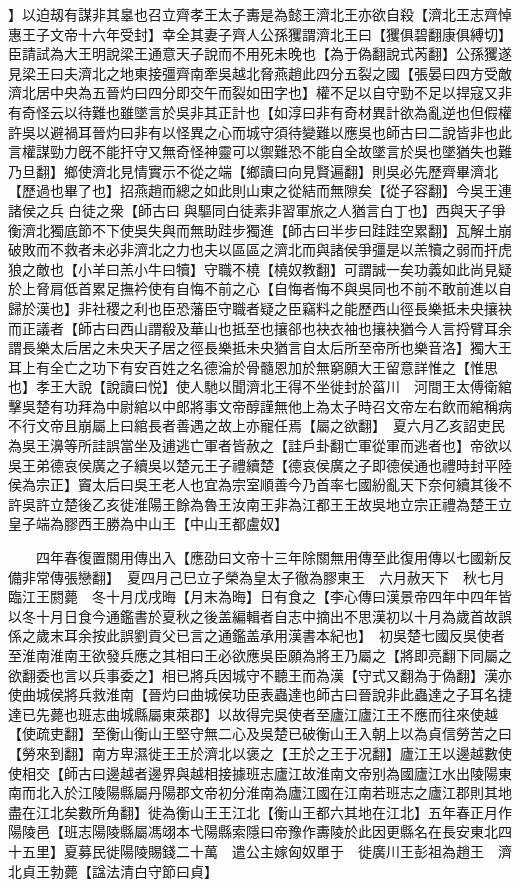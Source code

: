 】以迫刼有謀非其辠也召立齊孝王太子夀是為懿王濟北王亦欲自殺【濟北王志齊悼惠王子文帝十六年受封】幸全其妻子齊人公孫玃謂濟北王曰【玃俱碧翻康俱縛切】臣請試為大王明說梁王通意天子說而不用死未晚也【為于偽翻說式芮翻】公孫玃遂見梁王曰夫濟北之地東接彊齊南牽吳越北脅燕趙此四分五裂之國【張晏曰四方受敵濟北居中央為五晉灼曰四分即交午而裂如田字也】權不足以自守勁不足以捍寇又非有奇怪云以待難也雖墜言於吳非其正計也【如淳曰非有奇材異計欲為亂逆也但假權許吳以避禍耳晉灼曰非有以怪異之心而城守須待變難以應吳也師古曰二說皆非也此言權謀勁力旣不能扞守又無奇怪神靈可以禦難恐不能自全故墜言於吳也墜猶失也難乃旦翻】鄉使濟北見情實示不從之端【鄉讀曰向見賢遍翻】則吳必先歷齊畢濟北【歷過也畢了也】招燕趙而總之如此則山東之從結而無隙矣【從子容翻】今吳王連諸侯之兵白徒之衆【師古曰與驅同白徒素非習軍旅之人猶言白丁也】西與天子爭衡濟北獨底節不下使吳失與而無助跬步獨進【師古曰半步曰跬跬空累翻】瓦解土崩破敗而不救者未必非濟北之力也夫以區區之濟北而與諸侯爭彊是以羔犢之弱而扞虎狼之敵也【小羊曰羔小牛曰犢】守職不橈【橈奴教翻】可謂誠一矣功義如此尚見疑於上脅肩低首累足撫衿使有自悔不前之心【自悔者悔不與吳同也不前不敢前進以自歸於漢也】非社稷之利也臣恐藩臣守職者疑之臣竊料之能歷西山徑長樂抵未央攘袂而正議者【師古曰西山謂殽及華山也抵至也攘郤也袂衣袖也攘袂猶今人言捋臂耳余謂長樂太后居之未央天子居之徑長樂抵未央猶言自太后所至帝所也樂音洛】獨大王耳上有全亡之功下有安百姓之名德淪於骨髓恩加於無窮願大王留意詳惟之【惟思也】孝王大說【說讀曰悦】使人馳以聞濟北王得不坐徙封於菑川　河間王太傅衛綰擊吳楚有功拜為中尉綰以中郎將事文帝醇謹無他上為太子時召文帝左右飲而綰稱病不行文帝且崩屬上曰綰長者善遇之故上亦寵任焉【屬之欲翻】　夏六月乙亥詔吏民為吳王濞等所詿誤當坐及逋逃亡軍者皆赦之【詿戶卦翻亡軍從軍而逃者也】帝欲以吳王弟德哀侯廣之子續吳以楚元王子禮續楚【德哀侯廣之子即德侯通也禮時封平陸侯為宗正】竇太后曰吳王老人也宜為宗室順善今乃首率七國紛亂天下奈何續其後不許吳許立楚後乙亥徙淮陽王餘為魯王汝南王非為江都王王故吳地立宗正禮為楚王立皇子端為膠西王勝為中山王【中山王都盧奴】

　　四年春復置關用傳出入【應劭曰文帝十三年除關無用傳至此復用傳以七國新反備非常傳張戀翻】　夏四月己巳立子榮為皇太子徹為膠東王　六月赦天下　秋七月臨江王閼薨　冬十月戊戌晦【月末為晦】日有食之【李心傳曰漢景帝四年中四年皆以冬十月日食今通鑑書於夏秋之後盖編輯者自志中摘出不思漢初以十月為歲首故誤係之歲末耳余按此誤劉貢父已言之通鑑盖承用漢書本紀也】　初吳楚七國反吳使者至淮南淮南王欲發兵應之其相曰王必欲應吳臣願為將王乃屬之【將即亮翻下同屬之欲翻委也言以兵事委之】相已將兵因城守不聽王而為漢【守式又翻為于偽翻】漢亦使曲城侯將兵救淮南【晉灼曰曲城侯功臣表蟲達也師古曰晉說非此蟲達之子耳名捷達已先薨也班志曲城縣屬東萊郡】以故得完吳使者至廬江廬江王不應而往來使越【使疏吏翻】至衡山衡山王堅守無二心及吳楚已破衡山王入朝上以為貞信勞苦之曰【勞來到翻】南方卑濕徙王王於濟北以褒之【王於之王于况翻】廬江王以邊越數使使相交【師古曰邊越者邊界與越相接據班志廬江故淮南文帝别為國廬江水出陵陽東南而北入於江陵陽縣屬丹陽郡文帝初分淮南為廬江國在江南若班志之廬江郡則其地盡在江北矣數所角翻】徙為衡山王王江北【衡山王都六其地在江北】五年春正月作陽陵邑【班志陽陵縣屬馮翊本弋陽縣索隱曰帝豫作夀陵於此因更縣名在長安東北四十五里】夏募民徙陽陵賜錢二十萬　遣公主嫁匈奴單于　徙廣川王彭祖為趙王　濟北貞王勃薨【諡法清白守節曰貞】

